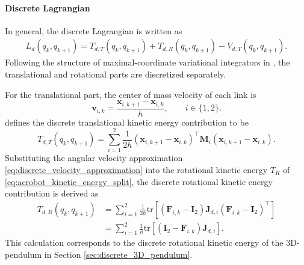 \paragraph{Discrete Lagrangian}

In general, the discrete Lagrangian is written as
\begin{align*}
    L_d(q_k,q_{k+1})
    =
    T_{d,T}(q_k,q_{k+1})
    +
    T_{d,R}(q_k,q_{k+1})
    -
    V_{d,T}(q_k,q_{k+1}).
    \label{eq:acrobot_discrete_lagrangian_split}
\end{align*}
Following the structure of maximal-coordinate variational
integrators in \cite{BrudigamManchester2021VariationalIntegrators},
the translational and rotational parts are
discretized separately.

For the translational part, the center of mass velocity of each link is 
\begin{equation}
    \bm{v}_{i,k}
    =
    \frac{\bm{x}_{i,k+1}-\bm{x}_{i,k}}{h},
    \qquad i\in\{1,2\}.
    \label{eq:acrobot_discrete_translational_velocity}
\end{equation}
\cite{BrudigamManchester2021VariationalIntegrators} defines the discrete translational kinetic energy contribution to be
\begin{equation}
    T_{d,T}(q_k,q_{k+1})
    =
    \sum_{i=1}^{2}
    \frac{1}{2h}
    \left(
    \bm{x}_{i,k+1}-\bm{x}_{i,k}
    \right)^{\top}
    \bm{M}_i
    \left(
    \bm{x}_{i,k+1}-\bm{x}_{i,k}
    \right).
    \label{eq:acrobot_discrete_translational_lagrangian}
\end{equation}
Substituting the angular velocity approximation \eqref{eq:discrete_velocity_approximation} into the rotational kinetic energy
$T_R$ of \eqref{eq:acrobot_kinetic_energy_split}, the discrete rotational kinetic
energy contribution is derived as
\begin{equation}
\begin{aligned}
    T_{d,R}(q_k,q_{k+1})
    &=
    \sum_{i=1}^{2}
    \frac{1}{2h}
    \mathrm{tr}
    \left[
    \left(
    \bm{F}_{i,k}-\bm{I}_{2}
    \right)
    \bm{J}_{d,i}
    \left(
    \bm{F}_{i,k}-\bm{I}_{2}
    \right)^{\top}
    \right] \\
    &=
    \sum_{i=1}^{2}
    \frac{1}{h}
    \mathrm{tr}
    \left[
    \left(
    \bm{I}_{2}
    -
    \bm{F}_{i,k}
    \right)
    \bm{J}_{d,i}
    \right].
\end{aligned}
\label{eq:acrobot_discrete_rotational_lagrangian}
\end{equation}
This calculation corresponds to the discrete rotational kinetic energy of the 3D-pendulum in Section \ref{sec:discrete_3D_pendulum}.


